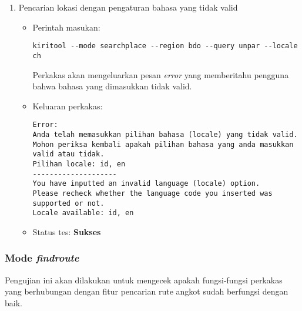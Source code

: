\begin{enumerate}
	\item Pencarian lokasi dengan pengaturan bahasa yang tidak valid
	\begin{itemize}
		\item Perintah masukan:
		\begin{lstlisting}
kiritool --mode searchplace --region bdo --query unpar --locale ch
		\end{lstlisting}
		Perkakas akan mengeluarkan pesan \textit{error} yang memberitahu pengguna bahwa bahasa yang dimasukkan tidak valid.
		\item Keluaran perkakas:
		\begin{lstlisting}
Error:
Anda telah memasukkan pilihan bahasa (locale) yang tidak valid.
Mohon periksa kembali apakah pilihan bahasa yang anda masukkan valid atau tidak.
Pilihan locale: id, en
--------------------
You have inputted an invalid language (locale) option.
Please recheck whether the language code you inserted was supported or not.
Locale available: id, en
		\end{lstlisting}
		\item Status tes: \textbf{Sukses}
	\end{itemize}
	
\end{enumerate}

\subsubsection{Mode \textit{findroute}}
\label{sec:testing-experiments-testing-findroute}

Pengujian ini akan dilakukan untuk mengecek apakah fungsi-fungsi perkakas yang berhubungan dengan fitur pencarian rute angkot sudah berfungsi dengan baik.

